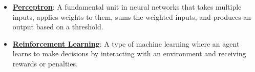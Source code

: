 \documentclass{article}%
\begin{document}
\begin{itemize}[leftmargin=*]
\item \href{\url{https://purdue.brightspace.com/d2l/common/assets/pdfjs-d2l-dist/1.0.14-legacy/web/viewer.html?file=\%252Fcontent\%252Fenforced\%252F1095467-wl.202510.CS.24300.001\%252F02L2-Intro.pdf\%253Fou\%253D1095467\&lang=en-us\&container=d2l-fileviewer-rendered-pdf\&fullscreen=d2l-fileviewer-rendered-pdf-dialog\&height=667}#page=45}{\textbf{Perceptron}}: A fundamental unit in neural networks that takes multiple inputs, applies weights to them, sums the weighted inputs, and produces an output based on a threshold.%
\item \href{\url{https://purdue.brightspace.com/d2l/common/assets/pdfjs-d2l-dist/1.0.14-legacy/web/viewer.html?file=\%252Fcontent\%252Fenforced\%252F1095467-wl.202510.CS.24300.001\%252F02L2-Intro.pdf\%253Fou\%253D1095467\&lang=en-us\&container=d2l-fileviewer-rendered-pdf\&fullscreen=d2l-fileviewer-rendered-pdf-dialog\&height=667}#page=46}{\textbf{Reinforcement Learning}}: A type of machine learning where an agent learns to make decisions by interacting with an environment and receiving rewards or penalties.%
\end{itemize}%
\end{document}
